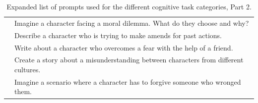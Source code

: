 \documentclass[11pt,a4paper]{ouparticle}
\begin{document}
\begin{table}[ht]
\begin{tabular}{>{\centering\arraybackslash}p{2.5cm} >{\centering\arraybackslash}p{13cm}}
                                                    & Imagine a character facing a moral dilemma. What do they choose and why? \\
                                                    & Describe a character who is trying to make amends for past actions. \\
                                                    & Write about a character who overcomes a fear with the help of a friend. \\
                                                    & Create a story about a misunderstanding between characters from different cultures. \\
                                                    & Imagine a scenario where a character has to forgive someone who wronged them. \\
        \bottomrule
        \bottomrule
    \end{tabular}
    \caption{Expanded list of prompts used for the different cognitive task categories, Part 2.}
    \label{tab:full_cognitive_task_examples_part2}
\end{table}

\clearpage
\end{document}
